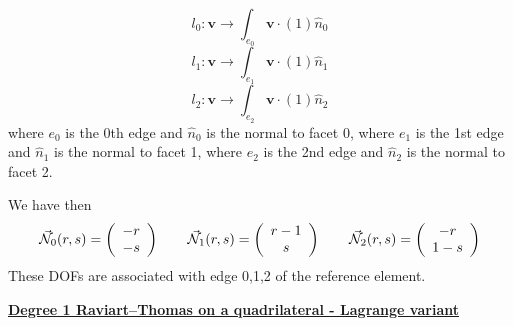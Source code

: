 \[
l_0: {\bm v} \rightarrow \int_{e_0} {\bm v} \cdot (1) \hat{n}_0
\]
\[
l_1: {\bm v} \rightarrow \int_{e_1} {\bm v} \cdot (1) \hat{n}_1
\]
\[
l_2: {\bm v} \rightarrow \int_{e_2} {\bm v} \cdot (1) \hat{n}_2
\]
where $e_0$ is the 0th edge and $\hat{n}_0$ is the normal to facet 0,
where $e_1$ is the 1st edge and $\hat{n}_1$ is the normal to facet 1,
where $e_2$ is the 2nd edge and $\hat{n}_2$ is the normal to facet 2.

We have then
\[
\vec{{\mathcal{N}}}_0(r,s) = \left( \begin{array}{c} -r\\-s  \end{array} \right)
\qquad
\vec{{\mathcal{N}}}_1(r,s) = \left( \begin{array}{c} r-1\\s  \end{array} \right)
\qquad
\vec{{\mathcal{N}}}_2(r,s) = \left( \begin{array}{c} -r \\ 1-s  \end{array} \right)
\]
These DOFs are associated with edge 0,1,2 of the reference element.




\vspace{.5cm}
\noindent
\underline{\bf Degree 1 Raviart–Thomas on a quadrilateral - Lagrange variant}

